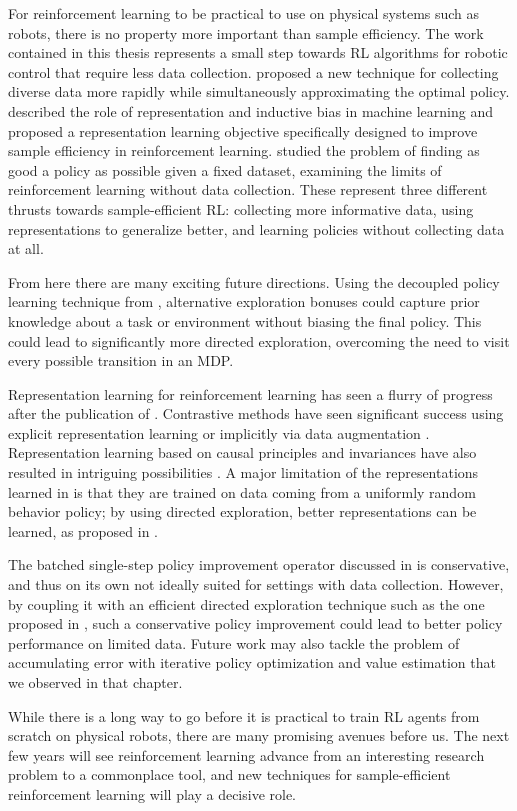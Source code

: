 For reinforcement learning to be practical to use on physical systems such as robots, there is no property more important than sample efficiency.
The work contained in this thesis represents a small step towards RL algorithms for robotic control that require less data collection.
 proposed a new technique for collecting diverse data more rapidly while simultaneously approximating the optimal policy.
 described the role of representation and inductive bias in machine learning and proposed a representation learning objective specifically designed to improve sample efficiency in reinforcement learning.
 studied the problem of finding as good a policy as possible given a fixed dataset, examining the limits of reinforcement learning without data collection.
These represent three different thrusts towards sample-efficient RL: collecting more informative data, using representations to generalize better, and learning policies without collecting data at all.

From here there are many exciting future directions.
Using the decoupled policy learning technique from , alternative exploration bonuses could capture prior knowledge about a task or environment without biasing the final policy.
This could lead to significantly more directed exploration, overcoming the need to visit every possible transition in an MDP.

Representation learning for reinforcement learning has seen a flurry of progress after the publication of .
Contrastive methods have seen significant success using explicit representation learning or implicitly via data augmentation \citep{Srinivas2020CURLCU,laskin2020reinforcement,Kostrikov2021ImageAI}.
Representation learning based on causal principles and invariances have also resulted in intriguing possibilities \citep{Zhang2020InvariantCP,Zhang2021LearningIR}.
A major limitation of the representations learned in  is that they are trained on data coming from a uniformly random behavior policy; by using directed exploration, better representations can be learned, as proposed in \citep{Yarats2021ReinforcementLW}.

The batched single-step policy improvement operator discussed in  is conservative, and thus on its own not ideally suited for settings with data collection.
However, by coupling it with an efficient directed exploration technique such as the one proposed in , such a conservative policy improvement could lead to better policy performance on limited data.
Future work may also tackle the problem of accumulating error with iterative policy optimization and value estimation that we observed in that chapter.

While there is a long way to go before it is practical to train RL agents from scratch on physical robots, there are many promising avenues before us.
The next few years will see reinforcement learning advance from an interesting research problem to a commonplace tool, and new techniques for sample-efficient reinforcement learning will play a decisive role.

